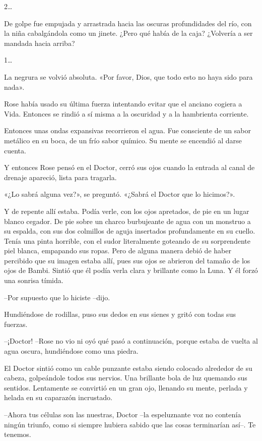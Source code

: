 {2\ldots{}}

{De golpe fue empujada y arrastrada hacia las oscuras profundidades del
 río, con la niña cabalgándola como un jinete. ¿Pero qué había de la
caja? ¿Volvería a ser mandada hacia arriba?}

{1\ldots{}}

{La negrura se volvió absoluta. «Por favor, Dios, que todo esto no haya
sido para nada».}

\mbox{}

{Rose había usado su última fuerza intentando evitar que el anciano
 cogiera a Vida. Entonces se rindió a sí misma a la oscuridad y a la
hambrienta corriente.}

{Entonces unas ondas expansivas recorrieron el agua. Fue consciente de
 un sabor metálico en su boca, de un frío sabor químico. Su mente se
encendió al darse cuenta.}

{Y entonces Rose pensó en el Doctor, cerró sus ojos cuando la entrada al
canal de drenaje apareció, lista para tragarla.}

{«¿Lo sabrá alguna vez?», se preguntó. «¿Sabrá el Doctor que lo
hicimos?».}

{Y de repente allí estaba. Podía verle, con los ojos apretados, de pie
 en un lugar blanco cegador. De pie sobre un charco burbujeante de agua
 con un monstruo a su espalda, con sus dos colmillos de aguja insertados
 profundamente en su cuello. Tenía una pinta horrible, con el sudor
 literalmente goteando de su sorprendente piel blanca, empapando sus
 ropas. Pero de alguna manera debió de haber percibido que su imagen
 estaba allí, pues sus ojos se abrieron del tamaño de los ojos de Bambi.
 Sintió que él podía verla clara y brillante como la Luna. Y él forzó una
sonrisa tímida.}

{--Por supuesto que lo hiciste --dijo.}

{Hundiéndose de rodillas, puso sus dedos en sus sienes y gritó con todas
sus fuerzas.}

{--¡Doctor! --Rose no vio ni oyó qué pasó a continuación, porque estaba
de vuelta al agua oscura, hundiéndose como una piedra.}

\mbox{}

{El Doctor sintió como un cable punzante estaba siendo colocado
 alrededor de su cabeza, golpeándole todos sus nervios. Una brillante
 bola de luz quemando sus sentidos. Lentamente se convirtió en un gran
ojo, llenando su mente, perlada y helada en su caparazón incrustado.}

{--Ahora tus células son las nuestras, Doctor --la espeluznante voz no
 contenía ningún triunfo, como si siempre hubiera sabido que las cosas
terminarían así--. Te tenemos.}

